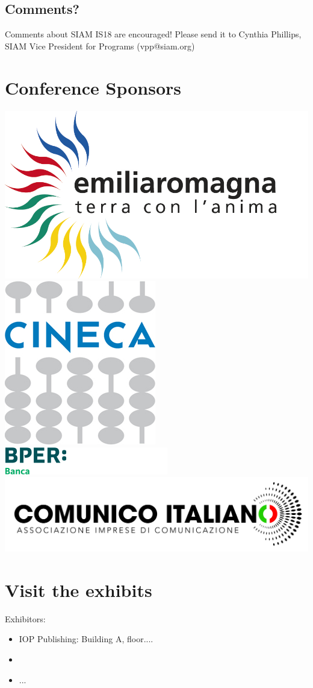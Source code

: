 \begin{multicols}{2}
\subsection*{Comments?}
Comments about SIAM IS18 are encouraged! Please send it to Cynthia Phillips, SIAM Vice President for Programs (vpp@siam.org)
\end{multicols}
\section*{Conference Sponsors}
\includegraphics[scale=0.25]{images/logo_APT}
\includegraphics[scale=0.4]{images/logo_CINECA}\\
\includegraphics[scale=0.5]{images/logo_BPER}
\includegraphics[scale=0.4]{images/logo_TIPO}\\
\section*{Visit the exhibits}
Exhibitors:
\begin{itemize}
\item IOP Publishing: Building A, floor....
\item
\item ...
\end{itemize}
